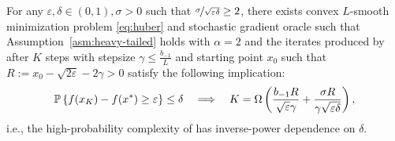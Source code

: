 \documentclass{article}
\begin{document}
\begin{theorem}\label{thm:adagrad-bad}
    For any $\varepsilon, \delta \in (0,1), \sigma > 0$ such that $\nicefrac{\sigma}{\sqrt{\varepsilon\delta}} \geq 2$, there exists convex $L$-smooth minimization problem \eqref{eq:huber} and stochastic gradient oracle such that Assumption~\ref{asm:heavy-tailed} holds with $\alpha = 2$ and the iterates produced by  after $K$ steps with stepsize $\gamma \leq \frac{b_{-1}}{L}$ and starting point $x_0$ such that $R := x_0 - \sqrt{2\varepsilon} - 2\gamma > 0$ satisfy the following implication:
    \begin{equation}
        {\mathbb P}\left\{f(x_K) - f(x^*) \geq \varepsilon\right\} \leq \delta \quad \Longrightarrow \quad K = \Omega\left(\frac{b_{-1}R}{\sqrt{\varepsilon}\gamma} + \frac{\sigma R}{\gamma\sqrt{\varepsilon\delta}} \right), \label{eq:inverse_power_dependence_adagrad}
    \end{equation}
    i.e., the high-probability complexity of  has inverse-power dependence on $\delta$.
\end{theorem}
\end{document}
